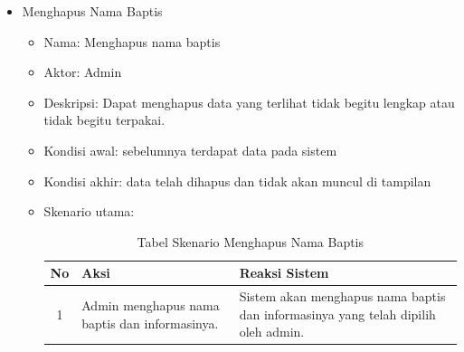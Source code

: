 \begin{enumerate}
\begin{enumerate}
\begin{itemize}
\begin{itemize}
\begin{table}[H]
\begin{tabular}{ | c | p{5cm} |p{5cm} |}
						\end{tabular}
	\label{table:skenario5}
\end{table}
				
				

                                \end{itemize}
																\item Menghapus Nama Baptis

                                \begin{itemize}
                                        \item Nama: Menghapus nama baptis
                                        \item Aktor: Admin
                                        \item Deskripsi: Dapat menghapus data yang terlihat tidak begitu lengkap atau tidak begitu terpakai.
                                        \item Kondisi awal: sebelumnya terdapat data pada sistem %
                                        \item Kondisi akhir: data telah dihapus dan tidak akan muncul di tampilan%
                                        \item Skenario utama:														
				
				\begin{table}[H]
	\centering
	\caption{Tabel Skenario Menghapus Nama Baptis}
		\begin{tabular}{ | c | p{5cm} |p{5cm} |} \hline
     No  & Aksi & Reaksi Sistem\\ \hline 
				1 & Admin menghapus nama baptis dan informasinya.%
				&  Sistem akan menghapus nama baptis dan informasinya yang telah dipilih oleh admin.\\ \hline
		
						\end{tabular}
	\label{table:skenario6}
\end{table}
				
		
\end{itemize}
\end{itemize}
 \end{enumerate}
 \end{enumerate}%


